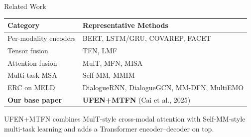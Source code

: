 \documentclass[aspectratio=169,10pt]{beamer}
\begin{document}
\begin{frame}{Related Work}
  \small
  \begin{tabular}{ll}
    \toprule
    \textbf{Category} & \textbf{Representative Methods} \\
    \midrule
    Per-modality encoders & BERT, LSTM/GRU, COVAREP, FACET \\
    Tensor fusion         & TFN, LMF \\
    Attention fusion      & MulT, MFN, MISA \\
    Multi-task MSA        & Self-MM, MMIM \\
    ERC on MELD           & DialogueRNN, DialogueGCN, MM-DFN, MultiEMO \\
    \midrule
    \textbf{Our base paper} & \textbf{UFEN+MTFN} (Cai et al., 2025) \\
    \bottomrule
  \end{tabular}
  \vspace{0.7em}

  UFEN+MTFN combines MulT-style cross-modal attention with Self-MM-style
  multi-task learning and adds a Transformer encoder--decoder on top.
\end{frame}
\end{document}
